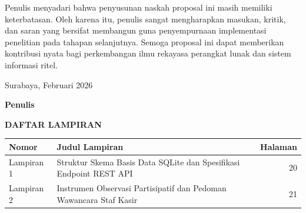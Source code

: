 \documentclass[11pt, a4paper]{article}
\begin{document}
Penulis menyadari bahwa penyusunan naskah proposal ini masih memiliki keterbatasan. Oleh karena itu, penulis sangat mengharapkan masukan, kritik, dan saran yang bersifat membangun guna penyempurnaan implementasi penelitian pada tahapan selanjutnya. Semoga proposal ini dapat memberikan kontribusi nyata bagi perkembangan ilmu rekayasa perangkat lunak dan sistem informasi ritel.

\vspace{1.2cm}
\begin{flushright}
    \begin{minipage}{5cm}
    Surabaya, Februari 2026\par
    \vspace{1.5cm}
    \textbf{Penulis}
    \end{minipage}
\end{flushright}

\newpage
{}
\tableofcontents

\newpage
{}
\listoftables

\newpage
{}
\listoffigures

\newpage
{}
\begin{center}
    {\large \textbf{DAFTAR LAMPIRAN}\par}
\end{center}
\vspace{0.8cm}
\noindent
\begin{tabularx}{\textwidth}{@{}l X r@{}}
\textbf{Nomor} & \textbf{Judul Lampiran} & \textbf{Halaman} \\ \midrule
Lampiran 1 & Struktur Skema Basis Data SQLite dan Spesifikasi Endpoint REST API & 20 \\ \addlinespace[0.4em]
Lampiran 2 & Instrumen Observasi Partisipatif dan Pedoman Wawancara Staf Kasir & 21 \\ \bottomrule
\end{tabularx}
\end{document}
